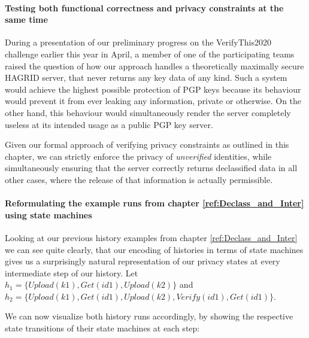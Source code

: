 \paragraph{Testing both functional correctness and privacy constraints at the same time}
During a presentation of our preliminary progress on the VerifyThis2020 challenge earlier this year in April, a member of one of the participating teams raised the question of how our approach handles a theoretically maximally secure HAGRID server, that never returns any key data of any kind. Such a system would achieve the highest possible protection of PGP keys because its behaviour would prevent it from ever leaking any information, private or otherwise. On the other hand, this behaviour would simultaneously render the server completely useless at its intended usage as a public PGP key server.

Given our formal approach of verifying privacy constraints as outlined in this chapter, we can strictly enforce the privacy of \emph{unverified} identities, while simultaneously ensuring that the server correctly returns declassified data in all other cases, where the release of that information is actually permissible. 

\paragraph{Reformulating the example runs from chapter \ref{ref:Declass_and_Inter} using state machines}
Looking at our previous history examples from chapter \ref{ref:Declass_and_Inter} we can see quite clearly, that our encoding of histories in terms of state machines gives us a surprisingly natural representation of our privacy states at every intermediate step of our history.
Let \(h_1=\{Upload(k1),Get(id1),Upload(k2)\}\) and \(h_2 = \{Upload(k1),Get(id1),Upload(k2),Verify(id1),Get(id1)\}\).

We can now visualize both history runs accordingly, by showing the respective state transitions of their state machines at each step:

